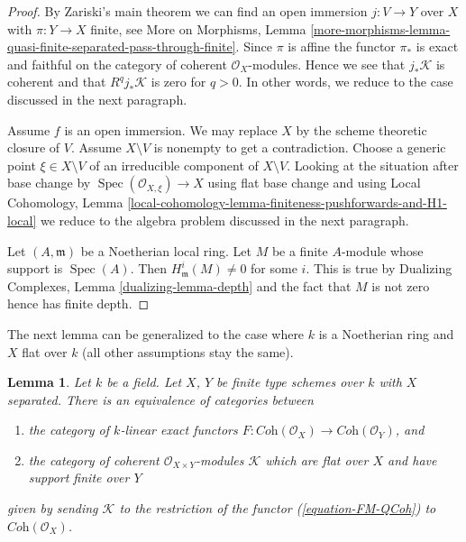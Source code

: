 \documentclass{stacks-project}
\theoremstyle{plain}
\newtheorem{lemma}[subsection]{Lemma}
\theoremstyle{definition}
\theoremstyle{remark}
\numberwithin{equation}{subsection}
\def\Spec{\mathop{\mathrm{Spec}}}
\begin{document}
\begin{proof}
By Zariski's main theorem we can find an open immersion
$j : V \to Y$ over $X$ with $\pi : Y \to X$ finite, see
More on Morphisms, Lemma
\ref{more-morphisms-lemma-quasi-finite-separated-pass-through-finite}.
Since $\pi$ is affine the functor $\pi_*$ is exact and faithful
on the category of coherent $\mathcal{O}_X$-modules.
Hence we see that $j_*\mathcal{K}$ is coherent and
that $R^qj_*\mathcal{K}$ is zero for $q > 0$.
In other words, we reduce to the case discussed in the next paragraph.

\medskip\noindent
Assume $f$ is an open immersion. We may replace $X$ by the
scheme theoretic closure of $V$. Assume $X \setminus V$ is nonempty
to get a contradiction. Choose a generic point $\xi \in X \setminus V$
of an irreducible component of $X \setminus V$. Looking at the situation
after base change by $\Spec(\mathcal{O}_{X, \xi}) \to X$ using flat base
change and using
Local Cohomology, Lemma
\ref{local-cohomology-lemma-finiteness-pushforwards-and-H1-local}
we reduce to the algebra problem discussed in the next paragraph.

\medskip\noindent
Let $(A, \mathfrak m)$ be a Noetherian local ring. Let $M$ be a finite
$A$-module whose support is $\Spec(A)$. Then $H^i_\mathfrak m(M) \not = 0$
for some $i$. This is true by
Dualizing Complexes, Lemma \ref{dualizing-lemma-depth}
and the fact that $M$ is not zero hence has finite depth.
\end{proof}

\noindent
The next lemma can be generalized to the case where $k$ is a
Noetherian ring and $X$ flat over $k$ (all other assumptions
stay the same).

\begin{lemma}
\label{lemma-functor-coherent-over-field}
Let $k$ be a field. Let $X$, $Y$ be finite type schemes over $k$ with
$X$ separated. There is an equivalence of categories between
\begin{enumerate}
\item the category of $k$-linear exact functors
$F : \textit{Coh}(\mathcal{O}_X) \to \textit{Coh}(\mathcal{O}_Y)$, and
\item the category of coherent $\mathcal{O}_{X \times Y}$-modules
$\mathcal{K}$ which are flat over $X$ and have support finite over $Y$
\end{enumerate}
given by sending $\mathcal{K}$ to the restriction of the functor
(\ref{equation-FM-QCoh}) to $\textit{Coh}(\mathcal{O}_X)$.
\end{lemma}
\end{document}
